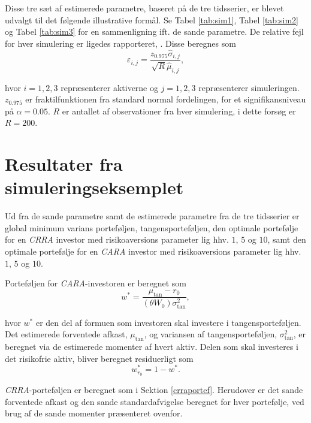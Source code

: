\documentclass[
  a4paper,
  oneside]{memoir}
\begin{document}
Disse tre sæt af estimerede parametre, baseret på de tre tidsserier, er blevet udvalgt til det følgende illustrative formål. Se Tabel \ref{tab:sim1}, Tabel \ref{tab:sim2} og Tabel \ref{tab:sim3} for en sammenligning ift. de sande parametre. De relative fejl for hver simulering er ligedes rapporteret, \citep{Asmussen2007}. Disse beregnes som
\[\varepsilon_{i,j} = \frac{z_{0.975}\hat{\sigma}_{i,j}}{\sqrt{R}\hat{\mu}_{i,j}},\]

hvor \(i=1,2,3\) repræsenterer aktiverne og \(j=1,2,3\) repræsenterer simuleringen. \(z_{0.975}\) er fraktilfunktionen fra standard normal fordelingen, for et signifikansniveau på \(\alpha=0.05\). \(R\) er antallet af observationer fra hver simulering, i dette forsøg er \(R=200\).

\hypertarget{ressimeks}{%
\section{Resultater fra simuleringseksemplet}\label{ressimeks}}

Ud fra de sande parametre samt de estimerede parametre fra de tre tidsserier er global minimum varians porteføljen, tangensporteføljen, den optimale portefølje for en \emph{CRRA} investor med risikoaversions parameter lig hhv. \(1\), \(5\) og \(10\), samt den optimale portefølje for en \emph{CARA} investor med risikoaversions parameter lig hhv. \(1\), \(5\) og \(10\).

Porteføljen for \emph{CARA}-investoren er beregnet som
\[w^*=\frac{\mu_{\text{tan}}-r_0}{(\theta W_0)\sigma_{\text{tan}}^2},\]

hvor \(w^*\) er den del af formuen som investoren skal investere i tangensporteføljen. Det estimerede forventede afkast, \(\mu_{\text{tan}}\), og variansen af tangensporteføljen, \(\sigma_{\text{tan}}^2\), er beregnet via de estimerede momenter af hvert aktiv. Delen som skal investeres i det risikofrie aktiv, bliver beregnet residuerligt som
\[w_{r_0}^*=1-w^*.\]

\emph{CRRA}-porteføljen er beregnet som i Sektion \ref{crraportef}. Herudover er det sande forventede afkast og den sande standardafvigelse beregnet for hver portefølje, ved brug af de sande momenter præsenteret ovenfor.
\end{document}
